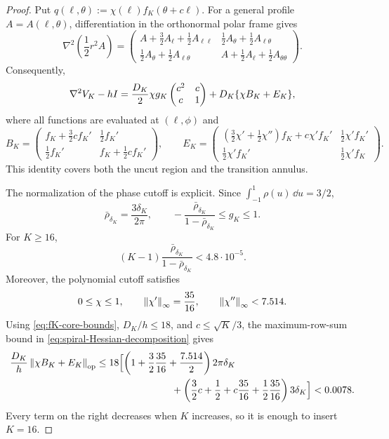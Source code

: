 \begin{proof}
Put $q(\ell,\theta):=\chi(\ell)f_K(\theta+c\ell)$.  For a general profile
$A=A(\ell,\theta)$, differentiation in the orthonormal polar frame gives
\[
    \nabla^2\left(\frac12r^2A\right)
    =
    \begin{pmatrix}
      A+\frac32A_\ell+\frac12A_{\ell\ell}
      &\frac12A_\theta+\frac12A_{\ell\theta}\\[1mm]
      \frac12A_\theta+\frac12A_{\ell\theta}
      &A+\frac12A_\ell+\frac12A_{\theta\theta}
    \end{pmatrix}.
\]
Consequently,
\begin{equation}
\label{eq:spiral-Hessian-decomposition}
 \nabla^2V_K-hI
 =\frac{D_K}{2}\chi g_K
     \begin{pmatrix}c^2&c\\c&1\end{pmatrix}
   +D_K\{\chi B_K+E_K\},
\end{equation}
where all functions are evaluated at $(\ell,\phi)$ and
\[
 B_K=
 \begin{pmatrix}
 f_K+\frac32cf_K'&\frac12f_K'\\
 \frac12f_K'&f_K+\frac12cf_K'
 \end{pmatrix},
 \qquad
 E_K=
 \begin{pmatrix}
 (\frac32\chi'+\frac12\chi'')f_K+c\chi'f_K'&\frac12\chi'f_K'\\
 \frac12\chi'f_K'&\frac12\chi'f_K
 \end{pmatrix}.
\]
This identity covers both the uncut region and the transition annulus.

The normalization of the phase cutoff is explicit.  Since
$\int_{-1}^1\rho(u)\,\dd u=3/2$,
\[
 \bar\rho_{\delta_K}=\frac{3\delta_K}{2\pi},
 \qquad
 -\frac{\bar\rho_{\delta_K}}{1-\bar\rho_{\delta_K}}
 \leq g_K\leq1.
\]
For $K\geq16$,
\begin{equation}
\label{eq:spiral-negative-background}
 (K-1)\frac{\bar\rho_{\delta_K}}{1-\bar\rho_{\delta_K}}
 <4.8\cdot10^{-5}.
\end{equation}
Moreover, the polynomial cutoff satisfies
\[
 0\leq\chi\leq1,
 \qquad
 \left\lVert \chi'\right\rVert_\infty=\frac{35}{16},
 \qquad
 \left\lVert \chi''\right\rVert_\infty<7.514.
\]
Using \eqref{eq:fK-core-bounds}, $D_K/h\leq18$, and
$c\leq\sqrt K/3$, the maximum-row-sum bound in
\eqref{eq:spiral-Hessian-decomposition} gives
\begin{align*}
 \frac{D_K}{h}\norm{\chi B_K+E_K}_{\op}
 &\leq18\Bigl[
   \left(1+\frac32\frac{35}{16}+\frac{7.514}{2}\right)2\pi\delta_K\\
 &\hspace{27mm}
  +\left(\frac32c+\frac12+c\frac{35}{16}+\frac12\frac{35}{16}\right)3\delta_K
  \Bigr]
 <0.0078.
\end{align*}
Every term on the right decreases when $K$ increases, so it is enough to insert $K=16$.


\end{proof}
